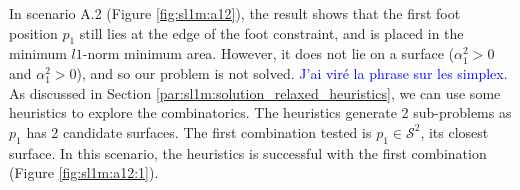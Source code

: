 In scenario A.2 (Figure \ref{fig:sl1m:a12}), the result shows that the first foot position $p_1$ still lies at the edge of the foot constraint, and is placed in the minimum $l1$-norm minimum area. However, it does not lie on a surface ($\alpha_1^2 > 0$ and $\alpha_1^2 > 0$), and so our problem is not solved.
  \textcolor{blue}{J'ai viré la phrase sur les simplex.}
As discussed in Section \ref{par:sl1m:solution_relaxed_heuristics}, we can use some heuristics to explore the combinatorics. 
The heuristics generate 2 sub-problems as $p_1$ has 2 candidate surfaces.
The first combination tested is $p_1 \in \mathcal{S}^2$, its closest surface.
In this scenario, the heuristics is successful with the first combination (Figure \ref{fig:sl1m:a12:1}).

